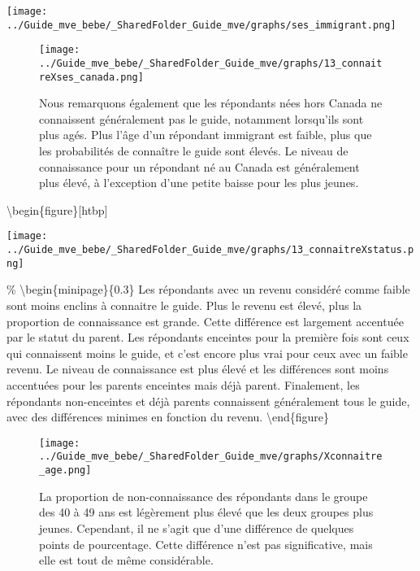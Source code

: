 \documentclass[
]{article}
\begin{document}
\texttt{[image: ../Guide\_mve\_bebe/\_SharedFolder\_Guide\_mve/graphs/ses\_immigrant.png]}

\begin{figure}[htbp]
  \centering
  \begin{minipage}{0.7\textwidth}
    \texttt{[image: ../Guide\_mve\_bebe/\_SharedFolder\_Guide\_mve/graphs/13\_connaitreXses\_canada.png]}
  \end{minipage}%
  \begin{minipage}{0.3\textwidth}
    \textbf{}Nous remarquons également que les répondants nées hors Canada ne connaissent généralement pas le guide, notamment lorsqu'ils sont plus agés. Plus l'âge d'un répondant immigrant est faible, plus que les probabilités de connaître le guide sont élevés. Le niveau de connaissance pour un répondant né au Canada est généralement plus élevé, à l'exception d'une petite baisse pour les plus jeunes.

  \end{minipage}
\end{figure}

\textbackslash begin\{figure\}{[}htbp{]} \centering

\begin{minipage}{0.7\textwidth}
    \texttt{[image: ../Guide\_mve\_bebe/\_SharedFolder\_Guide\_mve/graphs/13\_connaitreXstatus.png]}
  \end{minipage}

\% \textbackslash begin\{minipage\}\{0.3\textwidth\} \textbf{} Les
répondants avec un revenu considéré comme faible sont moins enclins à
connaitre le guide. Plus le revenu est élevé, plus la proportion de
connaissance est grande. Cette différence est largement accentuée par le
statut du parent. Les répondants enceintes pour la première fois sont
ceux qui connaissent moins le guide, et c'est encore plus vrai pour ceux
avec un faible revenu. Le niveau de connaissance est plus élevé et les
différences sont moins accentuées pour les parents enceintes mais déjà
parent. Finalement, les répondants non-enceintes et déjà parents
connaissent généralement tous le guide, avec des différences minimes en
fonction du revenu. \textbackslash end\{figure\}

\begin{figure}[htbp]
  \centering
  \begin{minipage}{0.7\textwidth}
    \texttt{[image: ../Guide\_mve\_bebe/\_SharedFolder\_Guide\_mve/graphs/Xconnaitre\_age.png]}
  \end{minipage}%
  \begin{minipage}{0.3\textwidth}
    \textbf{} La proportion de non-connaissance des répondants dans le groupe des 40 à 49 ans est légèrement plus élevé que les deux groupes plus jeunes. Cependant, il ne s'agit que d'une différence de quelques points de pourcentage. Cette différence n'est pas significative, mais elle est tout de même considérable.
  \end{minipage}
\end{figure}
\end{document}
